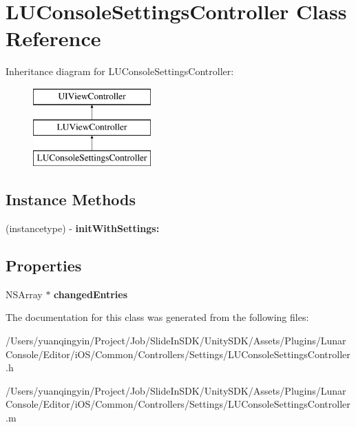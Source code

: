 \hypertarget{interface_l_u_console_settings_controller}{}\section{L\+U\+Console\+Settings\+Controller Class Reference}
\label{interface_l_u_console_settings_controller}
Inheritance diagram for L\+U\+Console\+Settings\+Controller\+:\begin{figure}[H]
\begin{center}
\leavevmode
\includegraphics[height=3.000000cm]{interface_l_u_console_settings_controller}
\end{center}
\end{figure}
\subsection*{Instance Methods}
\begin{DoxyCompactItemize}
\item 
\mbox{\label{interface_l_u_console_settings_controller_ac2aa9ea91d3b8ba6cd7241d35b606433}} 
(instancetype) -\/ {\bfseries init\+With\+Settings\+:}
\end{DoxyCompactItemize}
\subsection*{Properties}
\begin{DoxyCompactItemize}
\item 
\mbox{\label{interface_l_u_console_settings_controller_ac1533732ebc36b34de238ae8923987d8}} 
N\+S\+Array $\ast$ {\bfseries changed\+Entries}
\end{DoxyCompactItemize}


The documentation for this class was generated from the following files\+:\begin{DoxyCompactItemize}
\item 
/\+Users/yuanqingyin/\+Project/\+Job/\+Slide\+In\+S\+D\+K/\+Unity\+S\+D\+K/\+Assets/\+Plugins/\+Lunar\+Console/\+Editor/i\+O\+S/\+Common/\+Controllers/\+Settings/L\+U\+Console\+Settings\+Controller.\+h\item 
/\+Users/yuanqingyin/\+Project/\+Job/\+Slide\+In\+S\+D\+K/\+Unity\+S\+D\+K/\+Assets/\+Plugins/\+Lunar\+Console/\+Editor/i\+O\+S/\+Common/\+Controllers/\+Settings/L\+U\+Console\+Settings\+Controller.\+m\end{DoxyCompactItemize}
